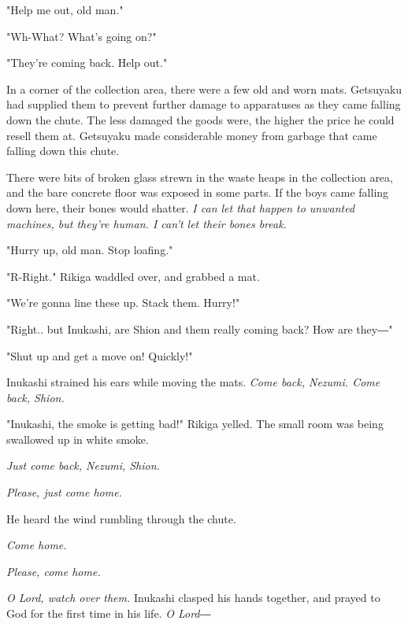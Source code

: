 "Help me out, old man."

"Wh-What? What's going on?"

"They're coming back. Help out."

In a corner of the collection area, there were a few old and worn mats.
Getsuyaku had supplied them to prevent further damage to apparatuses as
they came falling down the chute. The less damaged the goods were, the
higher the price he could resell them at. Getsuyaku made considerable
money from garbage that came falling down this chute.

There were bits of broken glass strewn in the waste heaps in the
collection area, and the bare concrete floor was exposed in some parts.
If the boys came falling down here, their bones would shatter. \emph{I can let
	that happen to unwanted machines, but they're human. I can't let their
	bones break.}

"Hurry up, old man. Stop loafing."

"R-Right." Rikiga waddled over, and grabbed a mat.

"We're gonna line these up. Stack them. Hurry!"

"Right.. but Inukashi, are Shion and them really coming back? How are
they―"

"Shut up and get a move on! Quickly!"

Inukashi strained his ears while moving the mats. \emph{Come back, Nezumi.
	Come back, Shion.}

"Inukashi, the smoke is getting bad!" Rikiga yelled. The small room was
being swallowed up in white smoke.

\emph{Just come back, Nezumi, Shion.}

\emph{Please, just come home.}

He heard the wind rumbling through the chute.

\emph{Come home.}

\emph{Please, come home.}

\emph{O Lord, watch over them.} Inukashi clasped his hands together, and prayed
to God for the first time in his life. \emph{O Lord―}